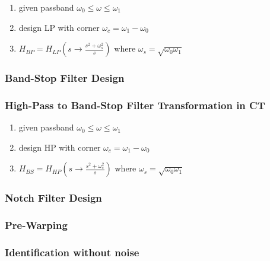 \documentclass[7pt,a4paper]{scrartcl}
\begin{document}
\begin{multicols*}{4}
\begin{enumerate}[leftmargin=*]
\ncompaq
\item given passband $\omega_0\leq\omega\leq\omega_1$
\item design LP with corner $\omega_c=\omega_1-\omega_0$
\item $H_{BP}=H_{LP}(s\rightarrow\frac{s^2+\omega_s^2}{s})$ where $\omega_s=\sqrt{\omega_0\omega_1}$
\end{enumerate}

\subsubsection*{Band-Stop Filter Design}



\subsubsection*{High-Pass to Band-Stop Filter Transformation in CT}

\begin{enumerate}[leftmargin=*]
\ncompaq
\item given passband $\omega_0\leq\omega\leq\omega_1$
\item design HP with corner $\omega_c=\omega_1-\omega_0$
\item $H_{BS}=H_{HP}(s\rightarrow\frac{s^2+\omega_s^2}{s})$ where $\omega_s=\sqrt{\omega_0\omega_1}$
\end{enumerate}

\subsubsection*{Notch Filter Design}


\subsubsection*{Pre-Warping}


\subsubsection*{Identification without noise}


\end{multicols*}
\end{document}
